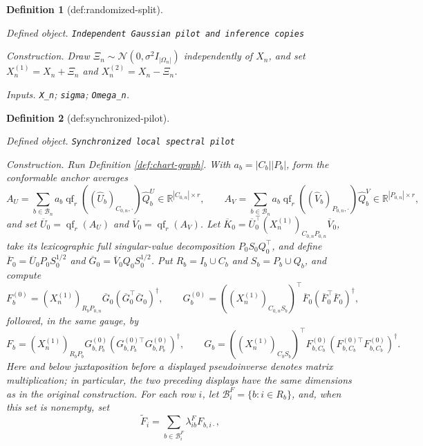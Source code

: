 \documentclass{article}
\newtheorem{definition}{Definition}
\begin{document}
\begin{definition}[def:randomized-split]\label{def:randomized-split}
\par\smallskip\noindent\emph{Defined object.} \texttt{Independent Gaussian pilot and inference copies}
\par\smallskip\noindent\emph{Construction.} Draw \(\Xi_n\sim\mathcal N(0,\sigma^2I_{|\Omega_n|})\) independently of \(X_n\), and set \(X_n^{(1)}=X_n+\Xi_n\) and \(X_n^{(2)}=X_n-\Xi_n\).
\par\smallskip\noindent\emph{Inputs.} \texttt{X\_\allowbreak{}n}; \texttt{sigma}; \texttt{Omega\_\allowbreak{}n}.
\end{definition}

\begin{definition}[def:synchronized-pilot]\label{def:synchronized-pilot}
\par\smallskip\noindent\emph{Defined object.} \texttt{Synchronized local spectral pilot}
\par\smallskip\noindent\emph{Construction.} Run Definition \ref{def:chart-graph}. With \(a_b=|C_b||P_b|\), form the conformable anchor averages
\[
A_U=\sum_{b\in\mathcal B_n}a_b\operatorname{qf}_r((\widehat U_b)_{C_{0,n},\cdot})\widehat Q_b^U\in\mathbb R^{|C_{0,n}|\times r},
\qquad
A_V=\sum_{b\in\mathcal B_n}a_b\operatorname{qf}_r((\widehat V_b)_{P_{0,n},\cdot})\widehat Q_b^V\in\mathbb R^{|P_{0,n}|\times r},
\]
and set \(\overline U_0=\operatorname{qf}_r(A_U)\) and \(\overline V_0=\operatorname{qf}_r(A_V)\). Let
\(\overline K_0=\overline U_0^{\top}(X_n^{(1)})_{C_{0,n}P_{0,n}}\overline V_0\), take its lexicographic full singular-value decomposition \(P_0S_0Q_0^{\top}\), and define
\(\overline F_0=\overline U_0P_0S_0^{1/2}\) and
\(\overline G_0=\overline V_0Q_0S_0^{1/2}\).
Put \(R_b=I_b\cup C_b\) and \(S_b=P_b\cup Q_b\), and compute
\[
F_b^{(0)}=(X_n^{(1)})_{R_bP_{0,n}}\overline G_0
(\overline G_0^{\top}\overline G_0)^{\dagger},
\qquad
G_b^{(0)}=((X_n^{(1)})_{C_{0,n}S_b})^{\top}\overline F_0
(\overline F_0^{\top}\overline F_0)^{\dagger},
\]
followed, in the same gauge, by
\[
F_b=(X_n^{(1)})_{R_bP_b}G_{b,P_b}^{(0)}
(G_{b,P_b}^{(0)\top}G_{b,P_b}^{(0)})^{\dagger},
\qquad
G_b=((X_n^{(1)})_{C_bS_b})^{\top}F_{b,C_b}^{(0)}
(F_{b,C_b}^{(0)\top}F_{b,C_b}^{(0)})^{\dagger}.
\]
Here and below juxtaposition before a displayed pseudoinverse denotes matrix multiplication; in particular, the two preceding displays have the same dimensions as in the original construction.
For each row \(i\), let \(\mathcal B_i^F=\{b:i\in R_b\}\), and, when this set is nonempty, set
\[
\widetilde F_i=\sum_{b\in\mathcal B_i^F}\lambda_{ib}^FF_{b,i\cdot},
\]
\end{definition}
\end{document}
